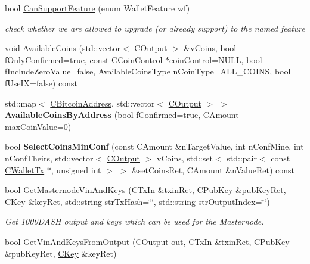 \begin{DoxyCompactItemize}
\mbox{\label{class_c_wallet_a83766f3d6797dba08c5ea136fa417c4d}} 
bool \mbox{\hyperlink{class_c_wallet_a83766f3d6797dba08c5ea136fa417c4d}{Can\+Support\+Feature}} (enum Wallet\+Feature wf)
\begin{DoxyCompactList}\small\item\em check whether we are allowed to upgrade (or already support) to the named feature \end{DoxyCompactList}\item 
void \mbox{\hyperlink{group___actions_ga8110e889be0f5915104e07bfe3839c68}{Available\+Coins}} (std\+::vector$<$ \mbox{\hyperlink{class_c_output}{C\+Output}} $>$ \&v\+Coins, bool f\+Only\+Confirmed=true, const \mbox{\hyperlink{class_c_coin_control}{C\+Coin\+Control}} $\ast$coin\+Control=N\+U\+LL, bool f\+Include\+Zero\+Value=false, Available\+Coins\+Type n\+Coin\+Type=A\+L\+L\+\_\+\+C\+O\+I\+NS, bool f\+Use\+IX=false) const
\item 
std\+::map$<$ \mbox{\hyperlink{class_c_bitcoin_address}{C\+Bitcoin\+Address}}, std\+::vector$<$ \mbox{\hyperlink{class_c_output}{C\+Output}} $>$ $>$ {\bfseries Available\+Coins\+By\+Address} (bool f\+Confirmed=true, C\+Amount max\+Coin\+Value=0)
\item 
bool {\bfseries Select\+Coins\+Min\+Conf} (const C\+Amount \&n\+Target\+Value, int n\+Conf\+Mine, int n\+Conf\+Theirs, std\+::vector$<$ \mbox{\hyperlink{class_c_output}{C\+Output}} $>$ v\+Coins, std\+::set$<$ std\+::pair$<$ const \mbox{\hyperlink{class_c_wallet_tx}{C\+Wallet\+Tx}} $\ast$, unsigned int $>$ $>$ \&set\+Coins\+Ret, C\+Amount \&n\+Value\+Ret) const
\item 
bool \mbox{\hyperlink{group__map_wallet_ga4deb7baa65e036149f7d19b3aefe7323}{Get\+Masternode\+Vin\+And\+Keys}} (\mbox{\hyperlink{class_c_tx_in}{C\+Tx\+In}} \&txin\+Ret, \mbox{\hyperlink{class_c_pub_key}{C\+Pub\+Key}} \&pub\+Key\+Ret, \mbox{\hyperlink{class_c_key}{C\+Key}} \&key\+Ret, std\+::string str\+Tx\+Hash=\char`\"{}\char`\"{}, std\+::string str\+Output\+Index=\char`\"{}\char`\"{})
\begin{DoxyCompactList}\small\item\em Get 1000\+D\+A\+SH output and keys which can be used for the Masternode. \end{DoxyCompactList}\item 
bool \mbox{\hyperlink{group__map_wallet_ga7621515b3195b8c8fb130c509725c9f2}{Get\+Vin\+And\+Keys\+From\+Output}} (\mbox{\hyperlink{class_c_output}{C\+Output}} out, \mbox{\hyperlink{class_c_tx_in}{C\+Tx\+In}} \&txin\+Ret, \mbox{\hyperlink{class_c_pub_key}{C\+Pub\+Key}} \&pub\+Key\+Ret, \mbox{\hyperlink{class_c_key}{C\+Key}} \&key\+Ret)

\end{DoxyCompactItemize}
